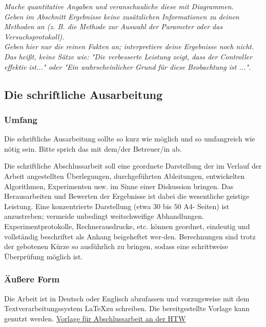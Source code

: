 
\emph{Mache quantitative Angaben und veranschauliche diese mit Diagrammen. 
\\
Geben  im Abschnitt Ergebnisse keine zusätzlichen Informationen zu deinen Methoden an (z. B. die Methode zur Auswahl der Parameter oder das Versuchsprotokoll). 
\\
Geben hier nur die reinen Fakten an; interpretiere deine Ergebnisse noch nicht. Das heißt, keine Sätze wie: "Die verbesserte Leistung zeigt, dass der Controller effektiv ist..." oder "Ein wahrscheinlicher Grund für diese Beobachtung ist ...".}



\subsection{Die schriftliche Ausarbeitung}
\label{sec:schriftlich}




\subsubsection{Umfang}
Die schriftliche Ausarbeitung sollte so kurz wie möglich und so umfangreich wie nötig sein. Bitte sprich das mit dem/der Betreuer/in ab.

Die schriftliche Abschlussarbeit soll eine geordnete Darstellung der im Verlauf der Arbeit angestellten Überlegungen, durchgeführten Ableitungen, entwickelten Algorithmen, Experimenten usw. im Sinne einer Diskussion bringen. Das Herausarbeiten und Bewerten der Ergebnisse ist dabei die wesentliche geistige Leistung. Eine konzentrierte Darstellung (etwa $30$ bis $50$ A4- Seiten) ist anzustreben; vermeide unbedingt weitschweifige Abhandlungen. Experimentprotokolle, Rechnerausdrucke, etc. können geordnet, eindeutig und vollständig beschriftet als Anhang beigeheftet wer-den. Berechnungen sind trotz der gebotenen Kürze so ausführlich zu bringen, sodass eine schrittweise Überprüfung möglich ist.

\subsubsection{Äußere Form}

Die Arbeit ist in Deutsch oder Englisch abzufassen und vorzugsweise mit dem Textverarbeitungssystem \LaTeX  zu schreiben. Die bereitgestellte Vorlage kann genutzt werden.
\hyperlink{https://www.overleaf.com/project/629f45ce28c12f2c468b8f78}{
Vorlage für Abschlussarbeit an der HTW}

